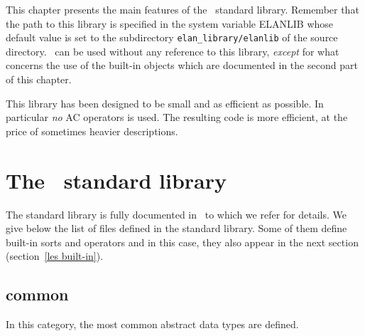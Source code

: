 


This chapter presents the main features of the \elan\ standard
library. Remember that the path to this library is specified in the system variable ELANLIB whose default value is set to the subdirectory {\tt elan\_library/elanlib} of the source directory. \elan\ can be used without any reference
to this library, {\it except\/} for what concerns the use of the
built-in objects which are documented in the second part of this chapter.

This   library has  been   designed to  be small  and  as efficient as
possible.   In  particular  {\it  no\/}  AC   operators  is used.  The
resulting  code is more  efficient, at  the  price of sometimes heavier
descriptions.


\section{The \elan\ standard library}

The standard library is fully documented in~\cite{elanlibManual-98} to 
which we refer for details. We give below the list of files defined in
the standard library. Some of them define built-in sorts and operators
and in this case, they also appear in the next section 
(section~\ref{les built-in}).

\subsection{common}

In this category, the most common abstract data types are defined.


